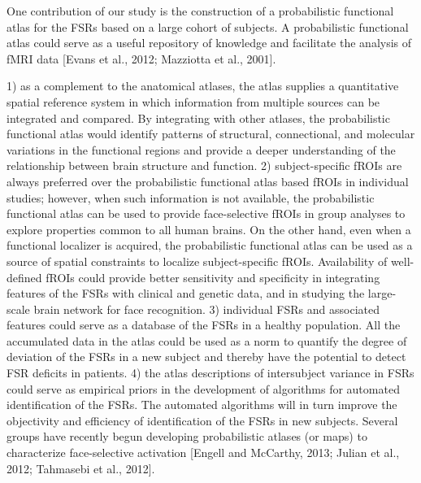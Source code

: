 One contribution of our study is the construction of a probabilistic functional
atlas for the FSRs based on a large cohort of subjects.
%
A probabilistic functional atlas could serve as a useful repository of knowledge
and facilitate the analysis of fMRI data [Evans et al., 2012; Mazziotta et al.,
2001].

1) as a complement to the anatomical atlases, the atlas supplies a quantitative
spatial reference system in which information from multiple sources can be
integrated and compared.
%
By integrating with other atlases, the probabilistic functional atlas would
identify patterns of structural, connectional, and molecular variations in the
functional regions and provide a deeper understanding of the relationship
between brain structure and function.
%
2) subject-specific fROIs are always preferred over the probabilistic functional
atlas based fROIs in individual studies;
%
however, when such information is not available, the probabilistic functional
atlas can be used to provide face-selective fROIs in group analyses to explore
properties common to all human brains.
%
On the other hand, even when a functional localizer is acquired, the
probabilistic functional atlas can be used as a source of spatial constraints to
localize subject-specific fROIs.
%
Availability of well-defined fROIs could provide better sensitivity and
specificity in integrating features of the FSRs with clinical and genetic data,
and in studying the large-scale brain network for face recognition.
%
3) individual FSRs and associated features could serve as a
database of the FSRs in a healthy population.
%
All the accumulated data in the atlas could be used as a norm to quantify the
degree of deviation of the FSRs in a new subject and thereby have the potential
to detect FSR deficits in patients.
%
4) the atlas descriptions of intersubject variance in FSRs could serve as
empirical priors in the development of algorithms for automated identification
of the FSRs.
%
The automated algorithms will in turn improve the objectivity and efficiency of
identification of the FSRs in new subjects.
%
Several groups have recently begun developing probabilistic atlases (or maps) to
characterize face-selective activation [Engell and McCarthy, 2013; Julian et
al., 2012; Tahmasebi et al., 2012].

